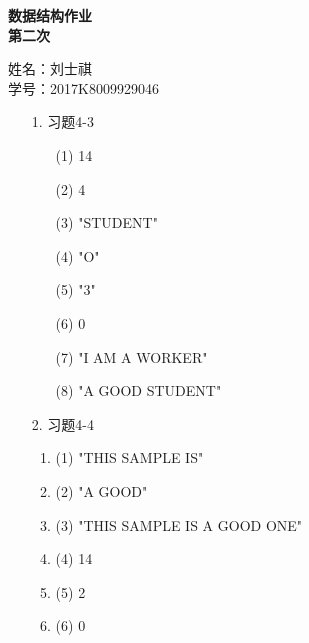 \documentclass[11pt]{article}
\begin{document}
\pagestyle{fancy}

\begin{center}
  {\LARGE{\bf{数据结构作业}}}\\
  {\large{\bf{第二次}}}\\
\end{center}

\begin{flushright}
  \begin{kaishu}
    姓名：刘士祺 \\
    学号：2017K8009929046 \\
  \end{kaishu}
\end{flushright}

\begin{enumerate}
  \item[1.] 习题4-3
    \begin{enumerate}
      \item [(1)] 14
      \item [(2)] 4
      \item [(3)] "STUDENT"
      \item [(4)] "O"
      \item [(5)] "3"
      \item [(6)] 0
      \item [(7)] "I AM A WORKER"
      \item [(8)] "A GOOD STUDENT"
    \end{enumerate}

  \item[2.] 习题4-4
    \begin{enumerate}
      \item{(1)} "THIS SAMPLE IS"
      \item{(2)} "A GOOD"
      \item{(3)} "THIS SAMPLE IS A GOOD ONE"
      \item{(4)} 14
      \item{(5)} 2
      \item{(6)} 0
    \end{enumerate}


\end{enumerate}
\end{document}
